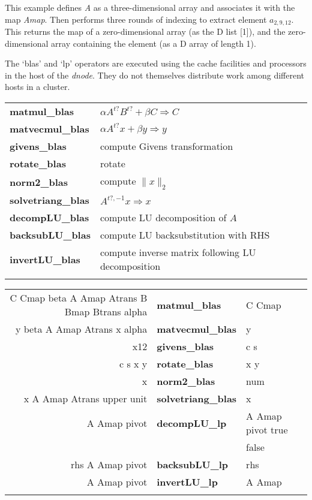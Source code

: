 \noindent This example defines \emph{A} as a three-dimensional array and associates it with the map \emph{Amap}. Then performs three rounds of indexing to extract element $a_{2,9,12}$. This returns the map of a zero-dimensional array (as the D list [1]), and the zero-dimensional array containing the element (as a D array of length 1).

The `blas' and `lp' operators are executed using the cache facilities and processors in the host of the \emph{dnode}. They do not themselves distribute work among different hosts in a cluster.\\

\begin{tabular}{>{\sffamily\bfseries}l>{\sffamily}l}
matmul\_blas & $\alpha A^{t?} B^{t?} + \beta C \Rightarrow C $ \\
matvecmul\_blas & $\alpha A^{t?} x + \beta y \Rightarrow y$ \\
givens\_blas & compute Givens transformation \\
rotate\_blas & rotate\\
norm2\_blas & compute $\lVert x \rVert _2$\\
solvetriang\_blas & $A^{t?,-1} x \Rightarrow x$\\
decompLU\_blas & compute LU decomposition of $A$\\
backsubLU\_blas & compute LU backsubstitution with RHS\\
invertLU\_blas & compute inverse matrix following LU decomposition\\\\
\end{tabular}

\begin{tabular}{>{\sffamily}r>{\sffamily\bfseries}l>{\sffamily}l}
C Cmap beta A Amap Atrans B Bmap Btrans alpha & matmul\_blas & C Cmap \\
y beta A Amap Atrans x alpha & matvecmul\_blas & y \\
x12 & givens\_blas & c s \\
c s x y & rotate\_blas & x y \\
x & norm2\_blas & num \\
x A Amap Atrans upper unit & solvetriang\_blas & x \\
A Amap pivot & decompLU\_lp & A Amap pivot true \\
                 &              & false\\
rhs A Amap pivot & backsubLU\_lp & rhs \\
A Amap pivot & invertLU\_lp & A Amap \\\\
\end{tabular}


